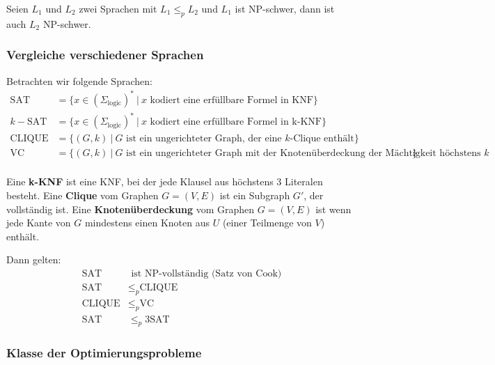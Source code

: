 \documentclass[11pt]{article}
\newcommand{\sat}{\text{SAT}}
\newcommand{\clique}{\text{CLIQUE}}
\newcommand{\vc}{\text{VC}}
\begin{document}
Seien $L_1$ und $L_2$ zwei Sprachen mit $L_1 \leq_p L_2$ und $L_1$ ist NP-schwer, dann ist auch $L_2$ NP-schwer.

\subsubsection{Vergleiche verschiedener Sprachen}

Betrachten wir folgende Sprachen:
\begin{equation*}
\begin{split}
	\sat & = \{x \in (\Sigma_\text{logic})^*\ |\ \text{$x$ kodiert eine erf{\"u}llbare Formel in KNF} \} \\
	k-\sat & = \{x \in (\Sigma_\text{logic})^*\ |\ \text{$x$ kodiert eine erf{\"u}llbare Formel in k-KNF} \} \\
	\clique & = \{(G,k)\ |\ \text{$G$ ist ein ungerichteter Graph, der eine $k$-Clique enth{\"a}lt} \} \\
	\vc & = \{(G,k)\ |\ \text{$G$ ist ein ungerichteter Graph mit der Knoten{\"u}berdeckung der M{\"a}chtigkeit höchstens $k$} \} \\
\end{split}
\end{equation*}

Eine \textbf{k-KNF} ist eine KNF, bei der jede Klausel aus höchstens 3 Literalen besteht.
Eine \textbf{Clique} vom Graphen $G = (V,E)$ ist ein Subgraph $G'$, der vollst{\"a}ndig ist.
Eine \textbf{Knoten{\"u}berdeckung} vom Graphen $G = (V,E)$ ist wenn jede Kante von $G$ mindestens einen Knoten aus $U$ (einer Teilmenge von $V$) enth{\"a}lt.

Dann gelten:
\begin{equation*}
\begin{split}
	\sat & \text{ ist NP-vollst{\"a}ndig (Satz von Cook)} \\
	\sat & \leq_p \clique \\
	\clique & \leq_p \vc \\
	\sat & \leq_p 3\sat
\end{split}
\end{equation*}

\subsubsection{Klasse der Optimierungsprobleme}
\end{document}
